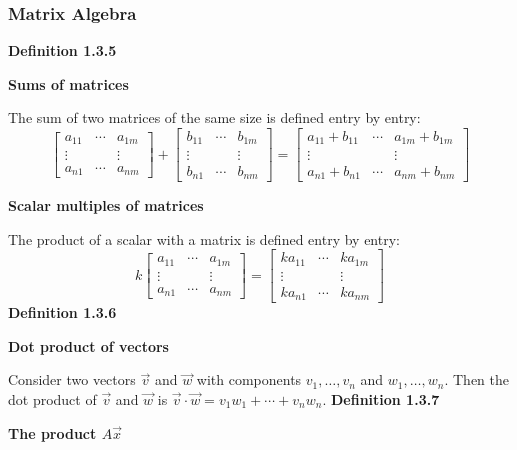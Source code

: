 \subsubsection*{Matrix Algebra}
\textbf{Definition 1.3.5}\\
\par\noindent\textbf{Sums of matrices}
\par\noindent The sum of two matrices of the same size is defined entry by entry:
\[\left[\begin{array}{ccc}a_{11} & \cdots & a_{1m}\\ \vdots & & \vdots\\ a_{n1} & \cdots & a_{nm}\end{array}\right]+\left[\begin{array}{ccc}b_{11} & \cdots & b_{1m}\\ \vdots & & \vdots\\ b_{n1} & \cdots & b_{nm}\end{array}\right]=\left[\begin{array}{ccc}a_{11}+b_{11} & \cdots & a_{1m}+b_{1m}\\ \vdots & & \vdots\\ a_{n1}+b_{n1} & \cdots & a_{nm}+b_{nm}\end{array}\right]\]
\par\noindent\textbf{Scalar multiples of matrices}
\par\noindent The product of a scalar with a matrix is defined entry by entry:
\[k\left[\begin{array}{ccc}a_{11} & \cdots & a_{1m}\\ \vdots & & \vdots\\ a_{n1} & \cdots & a_{nm}\end{array}\right]=\left[\begin{array}{ccc}ka_{11} & \cdots & ka_{1m}\\ \vdots & & \vdots\\ ka_{n1} & \cdots & ka_{nm}\end{array}\right]\]
\textbf{Definition 1.3.6}\\
\par\noindent\textbf{Dot product of vectors}
\par\noindent Consider two vectors $\vec{v}$ and $\vec{w}$ with components $v_{1},\ldots{},v_{n}$ and $w_{1},\ldots{},w_{n}$. Then the dot product of $\vec{v}$ and $\vec{w}$ is $\vec{v}\cdot\vec{w}=v_{1}w_{1}+\cdots{}+v_{n}w_{n}$.
\textbf{Definition 1.3.7}\\
\par\noindent\textbf{The product $A\vec{x}$}
